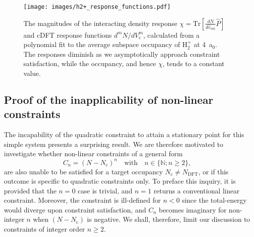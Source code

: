 \begin{figure}[th!]
\centering
\texttt{[image: images/h2+\_response\_functions.pdf]}
\caption[Interacting response functions for H$_2^+$ vs Lagrange multiplier]{
The magnitudes of the  
interacting density response 
$\chi=\mathrm{Tr} \left[ \frac{d N}{d \hat{v}_\textrm{ext}}  \hat{P} \right]$ 
and  cDFT response functions $d^m N / d V_\textrm{c}^m$, 
calculated from a polynomial fit to the
average subspace occupancy of H$_2^+$ at 4~a$_0$. 
%
The responses diminish as we asymptotically 
approach constraint satisfaction,
while the occupancy, 
and hence $\chi$, 
tends to a constant value.}
\label{fig:h2+_response_functions}
\end{figure}


\subsection{Proof of the inapplicability of non-linear constraints}

{
The incapability of the quadratic constraint 
to attain a stationary point for this simple system 
presents a surprising result.
%
We are therefore motivated to investigate whether 
non-linear constraints of a general form
%
\begin{equation}
C_n = ( N - N_\textrm{c} )^n
\quad\mbox{with}\quad
n\in \{\mathds{N}; n\geq2\}, 
\end{equation}
%
are also unable to be satisfied 
for a target occupancy 
$N_\textrm{c} \ne N_\textrm{DFT}$, 
or if this outcome is specific 
to quadratic constraints only.}
%
To preface this inquiry, 
it is provided that the $n=0$ case is trivial, 
and $n=1$ returns a conventional linear constraint.
%
Moreover, 
the constraint is ill-defined for $n<0$
since the total-energy would diverge 
upon constraint satisfaction, 
and $C_n$ becomes imaginary for non-integer $n$
when  $( N - N_\textrm{c})$ is negative.
%
We shall, therefore, 
limit our discussion to 
constraints of integer order $n \ge 2$.

